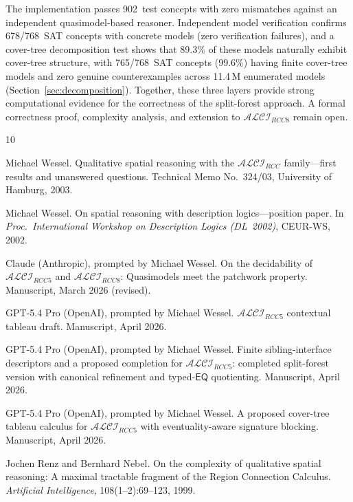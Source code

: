 \documentclass[a4paper,11pt]{article}
\theoremstyle{definition}
\newcommand{\ALCIRCC}[1]{\ensuremath{\mathcal{ALCI}_{\mathit{RCC#1}}}}
\newcommand{\EQ}{\ensuremath{\mathsf{EQ}}}
\begin{document}
The implementation passes 902~test concepts with zero mismatches
against an independent quasimodel-based reasoner.  Independent model
verification confirms 678/768~SAT concepts with concrete models
(zero verification failures), and a cover-tree decomposition test
shows that 89.3\% of these models naturally exhibit cover-tree
structure, with 765/768~SAT concepts (99.6\%) having finite
cover-tree models and zero genuine counterexamples across
11.4\,M enumerated models (Section~\ref{sec:decomposition}).
Together, these three
layers provide strong computational evidence for the correctness of
the split-forest approach.  A formal correctness proof, complexity
analysis, and extension to $\ALCIRCC{8}$ remain open.



\begin{thebibliography}{10}

Michael Wessel.
\newblock Qualitative spatial reasoning with the $\mathcal{ALCI}_{RCC}$
  family---first results and unanswered questions.
\newblock Technical Memo No.~324/03, University of Hamburg, 2003.

Michael Wessel.
\newblock On spatial reasoning with description logics---position paper.
\newblock In \emph{Proc.\ International Workshop on Description Logics
  (DL~2002)}, CEUR-WS, 2002.

Claude (Anthropic), prompted by Michael Wessel.
\newblock On the decidability of $\mathcal{ALCI}_{RCC5}$ and
  $\mathcal{ALCI}_{RCC8}$: Quasimodels meet the patchwork property.
\newblock Manuscript, March 2026 (revised).

GPT-5.4 Pro (OpenAI), prompted by Michael Wessel.
\newblock $\mathcal{ALCI}_{RCC5}$ contextual tableau draft.
\newblock Manuscript, April 2026.

GPT-5.4 Pro (OpenAI), prompted by Michael Wessel.
\newblock Finite sibling-interface descriptors and a proposed completion
  for $\mathcal{ALCI}_{RCC5}$: completed split-forest version with
  canonical refinement and typed-$\EQ$ quotienting.
\newblock Manuscript, April 2026.

GPT-5.4 Pro (OpenAI), prompted by Michael Wessel.
\newblock A proposed cover-tree tableau calculus for
  $\mathcal{ALCI}_{RCC5}$ with eventuality-aware signature blocking.
\newblock Manuscript, April 2026.

Jochen Renz and Bernhard Nebel.
\newblock On the complexity of qualitative spatial reasoning:
  A maximal tractable fragment of the Region Connection Calculus.
\newblock \emph{Artificial Intelligence}, 108(1--2):69--123, 1999.

\end{thebibliography}
\end{document}
